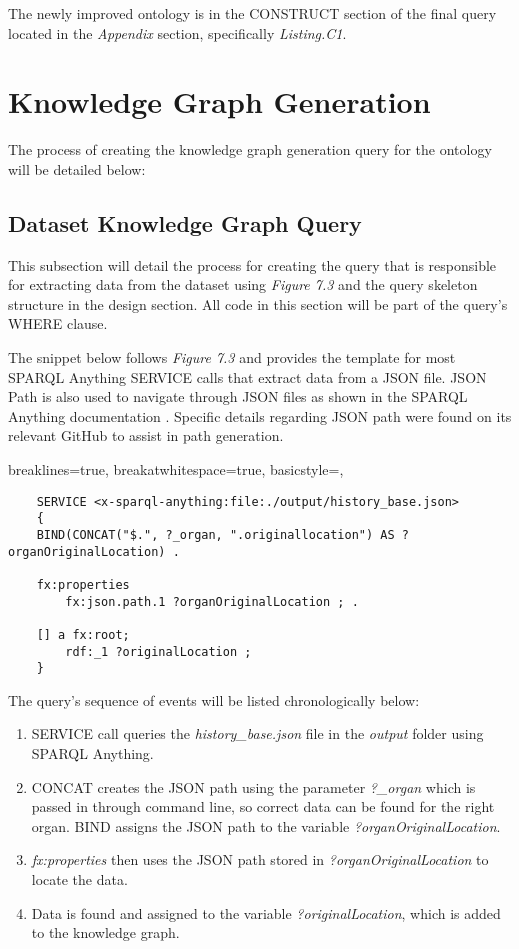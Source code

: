 The newly improved ontology is in the CONSTRUCT section of the final query located in the \textit{Appendix} section, specifically \textit{Listing.C1}.

\section{Knowledge Graph Generation}
\hspace*{0.5cm} The process of creating the knowledge graph generation query for the ontology will be detailed below:

\subsection{Dataset Knowledge Graph Query}
\hspace*{0.5cm} This subsection will detail the process for creating the query that is responsible for extracting data from the dataset using \textit{Figure 7.3} and the query skeleton structure in the design section. All code in this section will be part of the query's WHERE clause. 

The snippet below follows \textit{Figure 7.3} and provides the template for most SPARQL Anything SERVICE calls that extract data from a JSON file. JSON Path is also used to navigate through JSON files as shown in the SPARQL Anything documentation \cite{sparqlanythinggithub}. Specific details regarding JSON path were found on its relevant GitHub \cite{jsonpath} to assist in path generation. 

\lstset
{
    breaklines=true,
    breakatwhitespace=true,
    basicstyle=\ttfamily,
}
\begin{lstlisting}
    SERVICE <x-sparql-anything:file:./output/history_base.json> 
    {
    BIND(CONCAT("$.", ?_organ, ".originallocation") AS ?organOriginalLocation) .

    fx:properties
        fx:json.path.1 ?organOriginalLocation ; .

    [] a fx:root; 
        rdf:_1 ?originalLocation ;
    } 
\end{lstlisting}

The query's sequence of events will be listed chronologically below:

\begin{enumerate}
    \item SERVICE call queries the \textit{history\_base.json} file in the \textit{output} folder using SPARQL Anything. 
    \item CONCAT creates the JSON path using the parameter \textit{?\_organ} which is passed in through command line, so correct data can be found for the right organ. BIND assigns the JSON path to the variable \textit{?organOriginalLocation}.
    \item \textit{fx:properties} then uses the JSON path stored in \textit{?organOriginalLocation} to locate the data.
    \item Data is found and assigned to the variable \textit{?originalLocation}, which is added to the knowledge graph.
\end{enumerate}

